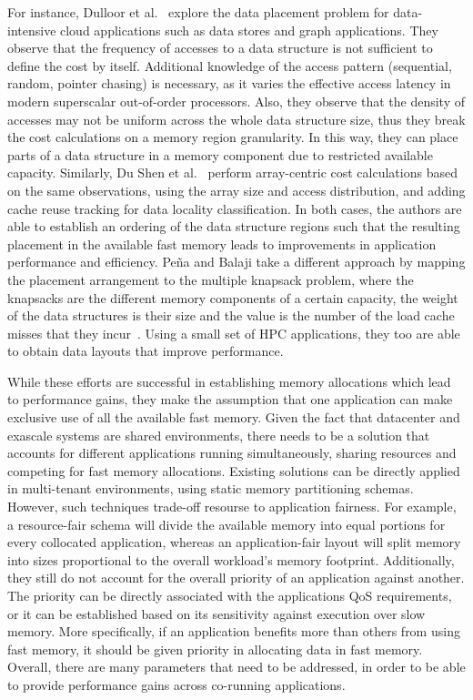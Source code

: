 For instance, Dulloor et al.~\cite{Dulloor:tiering} explore the data placement problem for data-intensive cloud applications such as data stores and graph applications. They 
observe that the frequency of accesses to a data structure is not sufficient to define the cost by itself. Additional knowledge of the access pattern 
(sequential, random, pointer chasing) is necessary, as it varies the effective access latency in modern superscalar out-of-order processors. Also, 
they observe that the density of accesses may not be uniform across the whole data structure size, thus they break the cost calculations on a memory region granularity. 
In this way, they can place parts of a data structure in a memory component due to restricted available capacity. 
Similarly, Du Shen et al.~\cite{Shen:dataplacer} perform array-centric cost calculations based on the same observations, using the array size and access distribution, and adding cache reuse tracking for data locality classification. 
In both cases, the authors are able to establish an ordering of the data structure regions such that the resulting placement in the available fast memory leads to improvements in application performance and efficiency. 
Pe\~{n}a and Balaji take a different approach by mapping the placement arrangement to the multiple knapsack problem, where the knapsacks are the different memory components of a certain capacity, 
the weight of the data structures is their size and the value is the number of the load cache misses that they incur~\cite{Pena:knapsack}. Using a small set of HPC applications, they too are able to obtain data layouts that improve performance. 


While these efforts are successful in establishing memory allocations which lead to performance gains, they make the assumption that one application can make exclusive use of all the available fast memory. 
Given the fact that datacenter and exascale systems are shared environments, there needs to be a solution that accounts for different applications running simultaneously, sharing resources 
and competing for fast memory allocations. Existing solutions can be directly applied in multi-tenant environments, using static memory partitioning schemas. 
However, such techniques trade-off resourse to application fairness. 
For example, a resource-fair schema will divide the available memory into equal portions for every collocated application, whereas an application-fair layout will split memory into sizes proportional to the 
overall workload's memory footprint. Additionally, they still do not account for the overall priority of an application against another. The priority can be directly associated with the applications QoS requirements, or it can be established based on its
sensitivity against execution over slow memory. More specifically, if an application benefits more than others from using fast memory, it should be given priority in allocating data in fast memory. 
Overall, there are many parameters that need to be addressed, in order to be able to provide performance gains across co-running applications.




